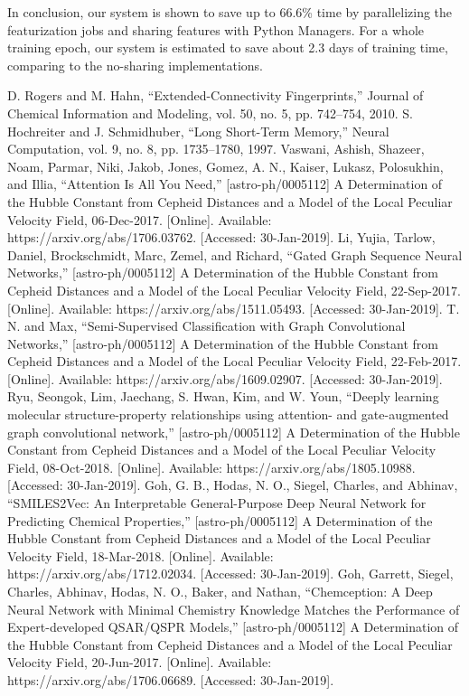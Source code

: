 \documentclass[conference]{IEEEtran}
\begin{document}
In conclusion, our system is shown to save up to 66.6\% time by parallelizing the featurization jobs and sharing features with Python Managers. 
For a whole training epoch, our system is estimated to save about 2.3 days of training time, comparing to the no-sharing implementations.

\begin{thebibliography}{}
	 D. Rogers and M. Hahn, “Extended-Connectivity Fingerprints,” Journal of Chemical Information and Modeling, vol. 50, no. 5, pp. 742–754, 2010.
	 S. Hochreiter and J. Schmidhuber, “Long Short-Term Memory,” Neural Computation, vol. 9, no. 8, pp. 1735–1780, 1997.
	 Vaswani, Ashish, Shazeer, Noam, Parmar, Niki, Jakob, Jones, Gomez, A. N., Kaiser, Lukasz, Polosukhin, and Illia, “Attention Is All You Need,” [astro-ph/0005112] A Determination of the Hubble Constant from Cepheid Distances and a Model of the Local Peculiar Velocity Field, 06-Dec-2017. [Online]. Available: https://arxiv.org/abs/1706.03762. [Accessed: 30-Jan-2019].
	 Li, Yujia, Tarlow, Daniel, Brockschmidt, Marc, Zemel, and Richard, “Gated Graph Sequence Neural Networks,” [astro-ph/0005112] A Determination of the Hubble Constant from Cepheid Distances and a Model of the Local Peculiar Velocity Field, 22-Sep-2017. [Online]. Available: https://arxiv.org/abs/1511.05493. [Accessed: 30-Jan-2019].
	 T. N. and Max, “Semi-Supervised Classification with Graph Convolutional Networks,” [astro-ph/0005112] A Determination of the Hubble Constant from Cepheid Distances and a Model of the Local Peculiar Velocity Field, 22-Feb-2017. [Online]. Available: https://arxiv.org/abs/1609.02907. [Accessed: 30-Jan-2019].
	 Ryu, Seongok, Lim, Jaechang, S. Hwan, Kim, and W. Youn, “Deeply learning molecular structure-property relationships using attention- and gate-augmented graph convolutional network,” [astro-ph/0005112] A Determination of the Hubble Constant from Cepheid Distances and a Model of the Local Peculiar Velocity Field, 08-Oct-2018. [Online]. Available: https://arxiv.org/abs/1805.10988. [Accessed: 30-Jan-2019].
	 Goh, G. B., Hodas, N. O., Siegel, Charles, and Abhinav, “SMILES2Vec: An Interpretable General-Purpose Deep Neural Network for Predicting Chemical Properties,” [astro-ph/0005112] A Determination of the Hubble Constant from Cepheid Distances and a Model of the Local Peculiar Velocity Field, 18-Mar-2018. [Online]. Available: https://arxiv.org/abs/1712.02034. [Accessed: 30-Jan-2019].
	 Goh, Garrett, Siegel, Charles, Abhinav, Hodas, N. O., Baker, and Nathan, “Chemception: A Deep Neural Network with Minimal Chemistry Knowledge Matches the Performance of Expert-developed QSAR/QSPR Models,” [astro-ph/0005112] A Determination of the Hubble Constant from Cepheid Distances and a Model of the Local Peculiar Velocity Field, 20-Jun-2017. [Online]. Available: https://arxiv.org/abs/1706.06689. [Accessed: 30-Jan-2019].

\end{thebibliography}
\end{document}
